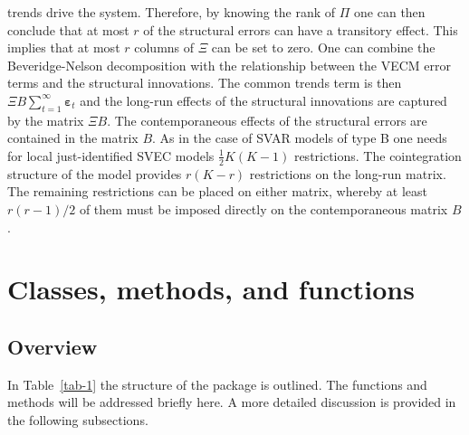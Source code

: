 \documentclass[nojss]{jss}
\begin{document}
trends drive the system. Therefore, by knowing the rank of $\Pi$ one
can then conclude that at most $r$ of the structural errors can have a
transitory effect. This implies that at most $r$ columns of $\Xi$ can be set to
zero. One can combine the Beveridge-Nelson decomposition with the
relationship between the VECM error terms and the structural
innovations. The common trends term is then $\Xi B \sum_{t=1}^\infty
\bm{\varepsilon}_t$ and the long-run effects of the structural
innovations are captured by the matrix $\Xi B$. The contemporaneous
effects of the structural errors are contained in the matrix $B$. As
in the case of SVAR models of type B one needs for local
just-identified SVEC models $\frac{1}{2}K(K-1)$ restrictions. The
cointegration structure of the model provides $r(K-r)$ restrictions
on the long-run matrix. The remaining restrictions can be placed on
either matrix, whereby at least $r(r-1)/2$ of them must be imposed directly
on the contemporaneous matrix $B$.   
\section{Classes, methods, and functions}
\label{sec:structure}
\subsection{Overview}
\label{subsec:overview}
In Table~\ref{tab-1} the structure of the package  is
outlined. The functions and methods will be addressed briefly here. A
more detailed discussion is provided in the following subsections.
 
\end{document}
